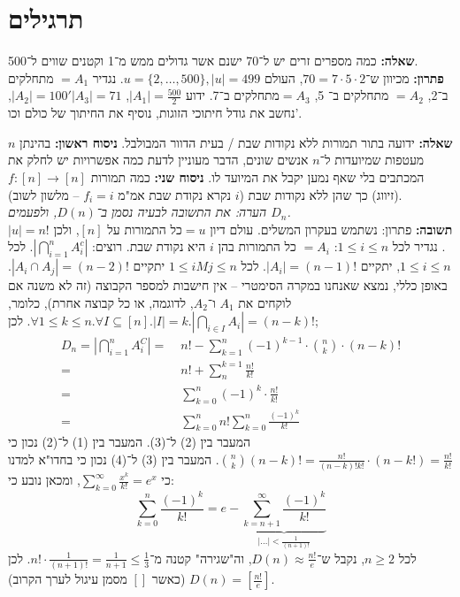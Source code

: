 \documentclass[]{article}
\newcommand\sumnk {\sum_{k = 0}^{n}}
\newcommand\bink  {\binom{n}{k}}
\begin{document}
	\section{תרגילים}
	\textbf{שאלה: }כמה מספרים זרים יש ל־70 ישנם אשר גדולים ממש מ־1 וקטנים שווים ל־500. \\
	\textbf{פתרון:}
	מכיוון ש־$ 70 = 7 \cdot 5 \cdot 2 $, העולם $u = \{2, \dots, 500\}, |u| = 499 $. נגדיר $= A_1 $ מתחלקים ב־2, $= A_2 $ מתחלקים ב־ 5, $= A_3 $מתחלקים ב־7. ידוע $|A_1| = \frac{500}{2}$, $|A_2| = 100' |A_3| = 71 $, נחשב את גודל חיתוכי הזוגות, נוסיף את החיתוך של כולם וכו'. 
	
	\textbf{שאלה: }ידועה בתור תמורות ללא נקודות שבת / בעית הדוור המבולבל. 
	\textbf{ניסוח ראשון: }בהינתן $n$ מעטפות שמיועדות ל־$n$ אנשים שונים, הדבר מעוניין לדעת כמה אפשרויות יש לחלק את המכתבים בלי שאף נמען יקבל את המיועד לו. \textbf{ניסוח שני: }כמה תמורות $f \colon [n] \to [n]$ (זיווג) כך שהן ללא נקודות שבת ($i$ נקרא נקודת שבת אמ"מ $f_i = i$ – מלשון לשוב). \\
	\textit{הערה: את התשובה לבעיה נסמן ב־$D(n)$, ולפעמים $D_n$. } \\
	\textbf{תשובה: }פתרון: נשתמש בעקרון המשלים. עולם דיון $= u $כל התמורות על $[n]$, ולכן $|u| = n!$. נגדיר לכל $1 \le i \le n$: $= A_i$ כל התמורות בהן $i$ היא נקודת שבת. רוצים: $| \bigcap_{i = 1}^n A_i^c|$. לכל $1 \le i \le n$, יתקיים $|A_i| = (n-1)!$. לכל $1 \le i M j \le n$ יתקיים $|A_i \cap A_j| = (n - 2)!$. באופן כללי, נמצא שאנחנו במקרה הסימטרי – אין חישבות למספר הקבוצה (זה לא משנה אם לוקחים את $A_1 $ ו־$A_2$, לדוגמה, או כל קבוצה אחרת), כלומר, $\forall 1 \le k \le n. \forall I \subseteq[n]. |I| = k. |\bigcap_{i \in I} A_i| = (n - k)!$. לכן; 
	\begin{align}
		D_n = | \bigcap_{i = 1}^n A_i^C | =& \; n! - \sum_{k = 1}^{n}(-1)^{k - 1} \cdot \bink \cdot (n - k)! \\
		= & \; n! + \sum_{n}^{k = 1}\frac{n!}{k!} \\
		= & \; \sumnk (-1)^k \cdot \frac{n!}{k!} \\
		= & \; \sumnk n! \sumnk \frac{(-1)^k}{k!}
	\end{align}
	המעבר בין (2) ל־(3). המעבר בין (1) ל־(2) נכון כי $\bink (n - k)! = \frac{n!}{(n - k)!k!} \cdot (n - k!) = \frac{n!}{k!}$. 
	המעבר בין (3) ל־(4) נכון כי בחדו"א למדנו כי $\sum_{k = 0}^{\infty} \frac{x^k}{k!} = e^x$, ומכאן נובע כי: 
	\[\sumnk \frac{(-1)^k}{k!} = e - \underbrace{\sum_{k =  n + 1}^{\infty} \frac{(-1)^k}{k!}}_{\displaystyle| \dots| < \frac{1}{(n + 1)!}}\]
	לכל $n \ge 2 $, נקבל ש־$D(n) \approx \frac{n!}{e}$, וה"שגירה" קטנה מ־$n! \cdot \frac{1}{(n + 1)!} = \frac{1}{n + 1} \le \frac{1}{3}$. לכן $D(n) = \left [ \frac{n!}{e} \right ]$ (כאשר $[]$ מסמן עיגול לערך הקרוב). 
	
	
\end{document}
